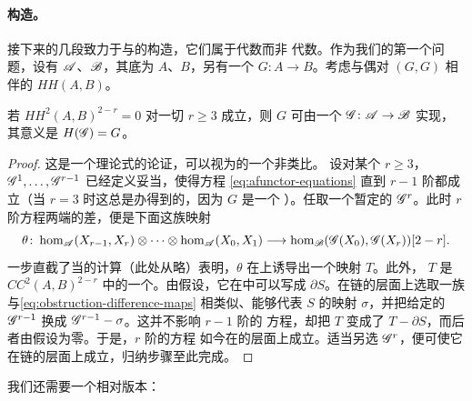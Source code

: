 \paragraph{构造\trFunctor。}\label{sub:constructing-functors}
接下来的几段致力于\trACategory{}与\trAFunctor{}的构造，它们属于\trHomotopy{}代数而非%
\trHomology{}代数。作为我们的第一个问题，设有\trNonunital{}\trACategory{}%
$\mathscr{A}$、$\mathscr{B}$，其底\trCohomology\trCategory{}为 $A$、$B$，另有一个\trNonunital\trFunctor{}%
$G\colon A\to B$。考虑与偶对 $(G,G)$ 相伴的\trHochschildCohomology{} $HH(A,B)$。

\begin{lemma}\label{thm:functor-realization-obstruction}
若 $HH^2(A,B)^{2-r}=0$ 对一切 $r\ge 3$ 成立，则 $G$ 可由一个\trNonunital{}\trAFunctor{}%
$\mathscr{G}\colon\mathscr{A}\to\mathscr{B}$ 实现，其意义是 $H(\mathscr{G})=G$。
\end{lemma}

\begin{proof}
这是一个\trObstruction{}理论式的论证，可以视为\trSpectralSequence{}的一个非\trLinear{}类比。
设对某个 $r\ge 3$，$\mathscr{G}^1,\ldots,\mathscr{G}^{r-1}$ 已经定义妥当，使得\trAFunctor{}方程
\eqref{eq:afunctor-equations} 直到 $r-1$ 阶都成立（当 $r=3$ 时这总是办得到的，因为 $G$ 是一个%
\trFunctor）。任取一个暂定的 $\mathscr{G}^r$。此时 $r$ 阶\trAFunctor{}方程两端的差，便是下面这族映射
\begin{equation}\label{eq:obstruction-difference-maps}
\theta\colon\hom_{\mathscr{A}}(X_{r-1},X_r)\otimes\cdots\otimes
\hom_{\mathscr{A}}(X_0,X_1)
\longrightarrow\hom_{\mathscr{B}}(\mathscr{G}(X_0),\mathscr{G}(X_r))[2-r].
\end{equation}
一步直截了当的计算（此处从略）表明，$\theta$ 在\trCohomology{}上诱导出一个映射 $T$。此外，
$T$ 是 $CC^2(A,B)^{2-r}$ 中的一个\trCocycle。由假设，它在\trHochschild\trComplex{}中可以写成
$\partial S$。在链的层面上选取一族与\eqref{eq:obstruction-difference-maps} 相类似、能够代表 $S$
的映射 $\sigma$，并把给定的 $\mathscr{G}^{r-1}$ 换成 $\mathscr{G}^{r-1}-\sigma$。这并不影响 $r-1$ 阶的%
\trAFunctor{}方程，却把 $T$ 变成了 $T-\partial S$，而后者由假设为零。于是，$r$ 阶的\trAFunctor{}方程
如今在\trCohomology{}的层面上成立。适当另选 $\mathscr{G}^r$，便可使它在链的层面上成立，归纳步骤至此完成。
\end{proof}

我们还需要一个相对版本：

